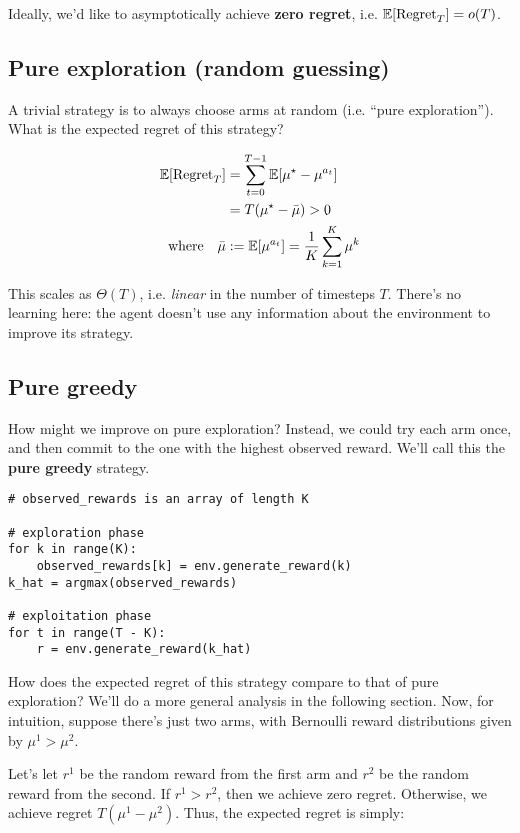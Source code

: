 \documentclass[../main/main]{subfiles}
\begin{document}
Ideally, we'd like to asymptotically achieve \textbf{zero regret}, i.e. $\operatorname*{\mathbb{E}}[\text{Regret}_T] = o(T)$.


\subsection{Pure exploration (random guessing)}

A trivial strategy is to always choose arms at random (i.e. ``pure exploration''). What is the expected regret of this strategy?

\begin{align*}
    \operatorname*{\mathbb{E}}[\text{Regret}_T] &= \sum_{t=0}^{T-1} \operatorname*{\mathbb{E}}[\mu^\star - \mu^{a_t}] \\
    &= T (\mu^\star - \bar \mu) > 0 \\
    \text{where} \quad \bar \mu &:= \operatorname*{\mathbb{E}}[\mu^{a_t}] = \frac{1}{K} \sum_{k=1}^K \mu^k
\end{align*}

This scales as $\Theta(T)$, i.e. \emph{linear} in the number of timesteps $T$. There's no learning here: the agent doesn't use any information about the environment to improve its strategy.

\subsection{Pure greedy}

How might we improve on pure exploration? Instead, we could try each arm once, and then commit to the one with the highest observed reward. We'll call this the \textbf{pure greedy} strategy.

\begin{lstlisting}
# observed_rewards is an array of length K

# exploration phase
for k in range(K):
    observed_rewards[k] = env.generate_reward(k)
k_hat = argmax(observed_rewards)

# exploitation phase
for t in range(T - K):
    r = env.generate_reward(k_hat)
\end{lstlisting}
    
How does the expected regret of this strategy compare to that of pure exploration? We'll do a more general analysis in the following section. Now, for intuition, suppose there's just two arms, with Bernoulli reward distributions given by $\mu^1 > \mu^2$.

Let's let $r^1$ be the random reward from the first arm and $r^2$ be the random reward from the second. If $r^1 > r^2$, then we achieve zero regret. Otherwise, we achieve regret $T(\mu^1 - \mu^2)$. Thus, the expected regret is simply:
\end{document}
